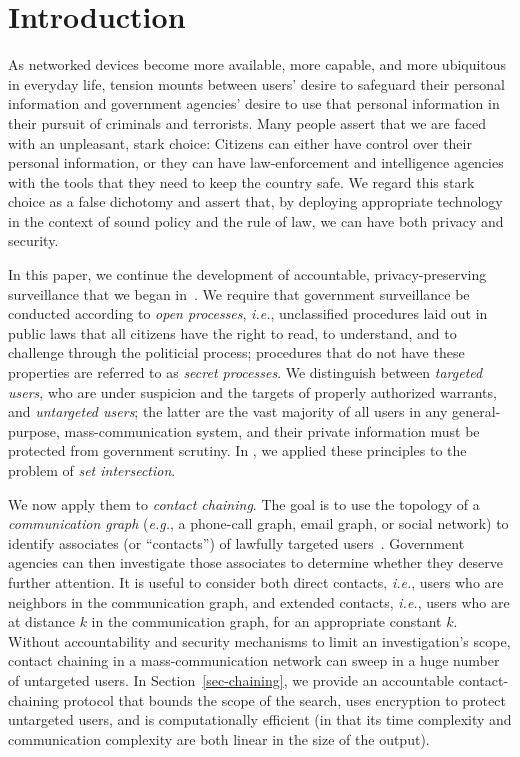 \section{Introduction}\label{sec-introduction}
As networked devices become more available, more capable, and more ubiquitous
in everyday life, tension mounts between users' desire to safeguard their 
personal information and government agencies' desire to use that personal 
information in their pursuit of criminals and terrorists.  Many people assert
that we are faced with an unpleasant, stark choice: Citizens can either have
control over their personal information, or they can have
law-enforcement and intelligence agencies with the tools that they need to
keep the country safe. We regard this stark choice as a false dichotomy and 
assert that, by deploying appropriate technology in the context of 
sound policy and the rule of law, we can have both privacy and security.

In this paper, we continue the development of accountable, privacy-preserving 
surveillance that we began in~\cite{sff-foci2014}. We require that government 
surveillance be conducted according to {\it open processes}, {\it i.e.}, 
unclassified procedures laid out in public laws that all citizens have the
right to read, to understand, and to challenge through the politicial process;
procedures that do not have these properties are referred to as {\it secret
processes}.  We distinguish between {\it targeted users}, who are 
under suspicion and the targets of properly authorized warrants, and
{\it untargeted users}; the latter are the vast majority of all 
users in any general-purpose, mass-communication system, and their private
information must be protected from government scrutiny. In \cite{sff-foci2014},
we applied these principles to the problem of {\it set intersection}. 

We now apply them to {\it contact chaining}.
The goal is to use the topology of a {\it communication 
graph} ({\it e.g.}, a phone-call graph, email graph, or social network) 
to identify associates (or ``contacts'') of 
lawfully targeted users~\cite{techdirt}. 
Government agencies can then investigate those associates to determine whether
they deserve further attention.
It is useful to consider both direct contacts, 
{\it i.e.}, users who are neighbors in the communication graph, and
extended contacts, {\it i.e.}, users who are at distance $k$ in the 
communication graph, for an appropriate constant $k$.
Without accountability and security mechanisms to
limit an investigation's scope, contact chaining in a mass-communication
network can sweep in a huge number of untargeted users.
In Section~\ref{sec-chaining}, we provide an accountable contact-chaining
protocol that bounds the scope of the search, uses encryption to protect 
untargeted users, and is computationally efficient (in that its time
complexity and communication complexity are both linear in the size of the 
output).

